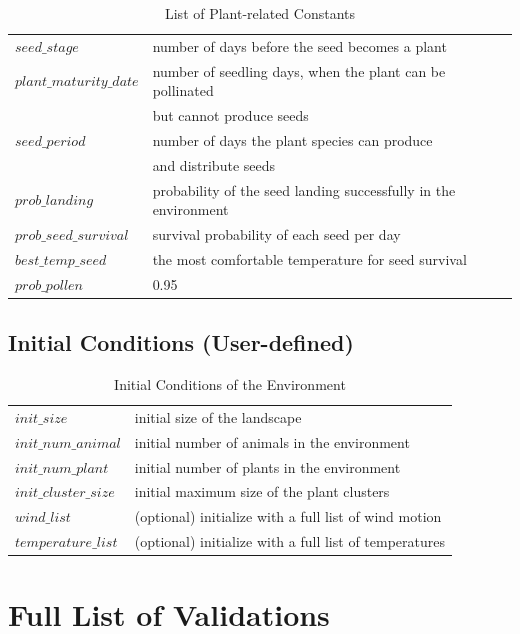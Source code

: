 \documentclass[3p,,preprint,12pt]{elsarticle}
\begin{document}
\begin{table}[!htb]
\begin{tabular}{ l l }
 $seed\_stage$ & number of days before the seed becomes a plant \\ 
 $plant\_maturity\_date$ & number of seedling days, when the plant can be pollinated \\
 & but cannot produce seeds\\ 
 $seed\_period$ & number of days the plant species can produce \\
 & and distribute seeds \\ 
 $prob\_landing$ & probability of the seed landing successfully in the environment \\ 
 $prob\_seed\_survival$ & survival probability of each seed per day \\
 $best\_temp\_seed$ & the most comfortable temperature for seed survival \\
 $prob\_pollen$ & 0.95 \\
\end{tabular}
\caption{\label{tab:table-name}List of Plant-related Constants}
\end{table}

\subsection{\textbf{Initial Conditions (User-defined)}}
\begin{table}[!htb]
\begin{tabular}{ l l }
 $init\_size$ & initial size of the landscape\\
 $init\_num\_animal$ & initial number of animals in the environment \\ 
 $init\_num\_plant$ & initial number of plants in the environment \\
 $init\_cluster\_size$ & initial maximum size of the plant clusters \\
 $wind\_list$ & (optional) initialize with a full list of wind motion \\
 $temperature\_list$ & (optional) initialize with a full list of temperatures \\
\end{tabular}
\caption{\label{tab:table-name}Initial Conditions of the Environment}
\end{table}
\pagebreak 


\section{Full List of Validations}
\end{document}
